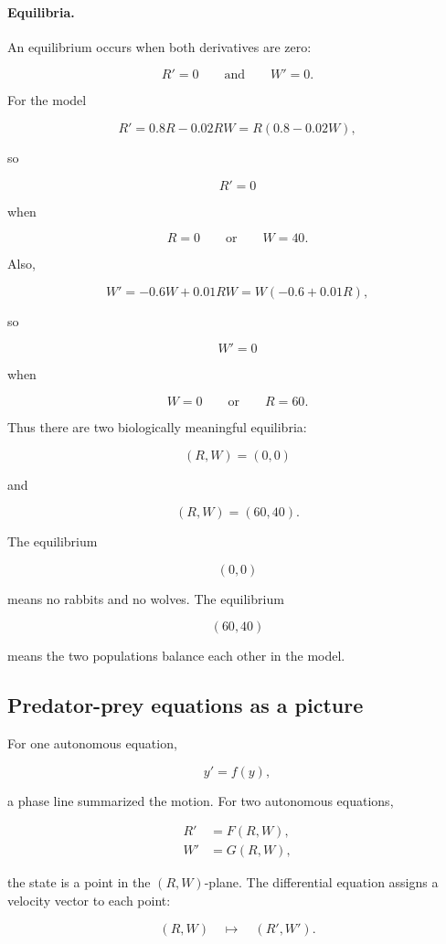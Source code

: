 \paragraph{Equilibria.}
An equilibrium occurs when both derivatives are zero:

\[
R'=0
\qquad\text{and}\qquad
W'=0.
\]

For the model

\[
R'=0.8R-0.02RW=R(0.8-0.02W),
\]

so

\[
R'=0
\]

when

\[
R=0
\qquad\text{or}\qquad
W=40.
\]

Also,

\[
W'=-0.6W+0.01RW=W(-0.6+0.01R),
\]

so

\[
W'=0
\]

when

\[
W=0
\qquad\text{or}\qquad
R=60.
\]

Thus there are two biologically meaningful equilibria:

\[
(R,W)=(0,0)
\]

and

\[
(R,W)=(60,40).
\]

The equilibrium

\[
(0,0)
\]

means no rabbits and no wolves.  The equilibrium

\[
(60,40)
\]

means the two populations balance each other in the model.

\subsection{Predator-prey equations as a picture}
\label{subsec:predator-prey-picture}

For one autonomous equation,

\[
y'=f(y),
\]

a phase line summarized the motion.  For two autonomous equations,

\[
\begin{aligned}
R'&=F(R,W),\\
W'&=G(R,W),
\end{aligned}
\]

the state is a point in the \((R,W)\)-plane.  The differential equation assigns a velocity
vector to each point:

\[
(R,W)
\quad\longmapsto\quad
(R',W').
\]

